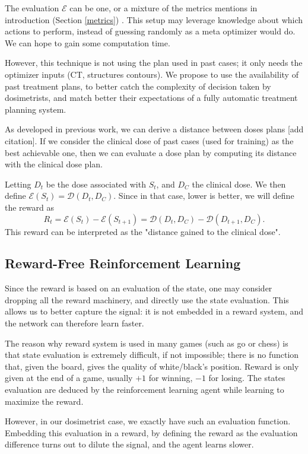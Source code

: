 The evaluation $\mathcal{E}$ can be one, or a mixture of the metrics mentions in introduction (Section \ref{metrics}) \cite{shen_hierarchical_2021} \cite{shen_intelligent_2019} \cite{moreau_reinforcement_2021}.
This setup may leverage knowledge about which actions to perform, instead of guessing randomly as a meta optimizer would do.
We can hope to gain some computation time.

However, this technique is not using the plan used in past cases; it only needs the optimizer inputs (CT, structures contours).
We propose to use the availability of past treatment plans, to better catch the complexity of decision taken by dosimetrists, and match better their expectations of a fully automatic treatment planning system.

As developed in previous work, we can derive a distance between doses plans [add citation].
If we consider the clinical dose of past cases (used for training) as the best achievable one, then we can evaluate a dose plan by computing its distance with the clinical dose plan.

Letting $D_t$ be the dose associated with $S_t$, and $D_C$ the clinical dose.
We then define $\mathcal{E}(S_t) = \mathcal{D}(D_t, D_C)$.
Since in that case, lower is better, we will define the reward as $$R_t = \mathcal{E}(S_t) - \mathcal{E}(S_{t+1}) = \mathcal{D}(D_t, D_C) - \mathcal{D}(D_{t+1}, D_C).$$
This reward can be interpreted as the "distance gained to the clinical dose".


\subsection{Reward-Free Reinforcement Learning}

Since the reward is based on an evaluation of the state, one may consider dropping all the reward machinery, and directly use the state evaluation.
This allows us to better capture the signal: it is not embedded in a reward system, and the network can therefore learn faster.

The reason why reward system is used in many games (such as go or chess) is that state evaluation is extremely difficult, if not impossible; there is no function that, given the board, gives the quality of white/black's position.
Reward is only given at the end of a game, usually $+1$ for winning, $-1$ for losing.
The states evaluation are deduced by the reinforcement learning agent while learning to maximize the reward.

However, in our dosimetrist case, we exactly have such an evaluation function.
Embedding this evaluation in a reward, by defining the reward as the evaluation difference turns out to dilute the signal, and the agent learns slower.

